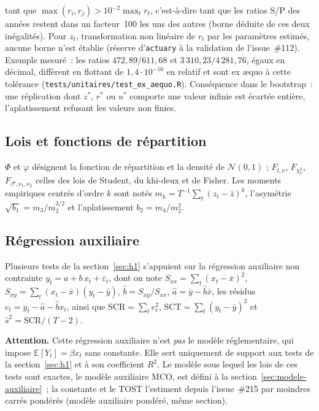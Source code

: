 \documentclass[a4paper,11pt]{article}
\newcommand{\code}[1]{\texttt{\small #1}}
\begin{document}
tant que $\max(r_i, r_j) > 10^{-2}\max_t r_t$, c'est-à-dire tant que les ratios S/P des années
restent dans un facteur~100 les uns des autres (borne déduite de ces deux inégalités). Pour
$z_t$, transformation non linéaire de $r_t$ par les paramètres estimés, aucune borne n'est
établie (réserve d'\code{actuary} à la validation de l'issue~\#112). Exemple mesuré~: les
ratios $472{,}89/611{,}68$ et $3\,310{,}23/4\,281{,}76$, égaux en décimal, diffèrent en
flottant de $1{,}4\cdot 10^{-16}$ en relatif et sont ex \ae quo à cette tolérance
(\code{tests/unitaires/test\_ex\_aequo.R}). Conséquence dans le bootstrap~: une réplication dont
$z^*$, $r^*$ ou $u^*$ comporte une valeur infinie est écartée entière, l'aplatissement refusant
les valeurs non finies.

\subsection*{Lois et fonctions de répartition}

$\Phi$ et $\varphi$ désignent la fonction de répartition et la densité de $\mathcal{N}(0,1)$ ;
$F_{t,\nu}$, $F_{\chi^2_\nu}$, $F_{\mathcal{F},\nu_1,\nu_2}$ celles des lois de Student, du
khi-deux et de Fisher. Les moments empiriques centrés d'ordre $k$ sont notés
$m_k = T^{-1}\sum_t (z_t - \bar z)^k$, l'asymétrie $\sqrt{b_1} = m_3/m_2^{3/2}$ et
l'aplatissement $b_2 = m_4/m_2^{2}$.

\subsection*{Régression auxiliaire}

Plusieurs tests de la section~\ref{sec:h1} s'appuient sur la régression auxiliaire non contrainte
$y_t = a + b\,x_t + \varepsilon_t$, dont on note
$S_{xx} = \sum_t (x_t-\bar x)^2$, $S_{xy} = \sum_t (x_t-\bar x)(y_t-\bar y)$,
$\hat b = S_{xy}/S_{xx}$, $\hat a = \bar y - \hat b \bar x$, les résidus
$e_t = y_t - \hat a - \hat b x_t$, ainsi que
$\mathrm{SCR} = \sum_t e_t^2$, $\mathrm{SCT} = \sum_t (y_t - \bar y)^2$ et
$\hat s^2 = \mathrm{SCR}/(T-2)$.

\medskip
\begin{encadre}
\textbf{Attention.} Cette régression auxiliaire n'est \emph{pas} le modèle réglementaire, qui
impose $\mathbb{E}[Y_t] = \beta x_t$ sans constante. Elle sert uniquement de support aux tests
de la section~\ref{sec:h1} et à son coefficient $R^2$. Le modèle sous lequel les lois de ces tests
sont exactes, le modèle auxiliaire MCO, est défini à la section~\ref{sec:modele-auxiliaire}~; la
constante et le TOST l'estiment depuis l'issue~\#215 par moindres carrés pondérés (modèle
auxiliaire pondéré, même section).
\end{encadre}
\end{document}

